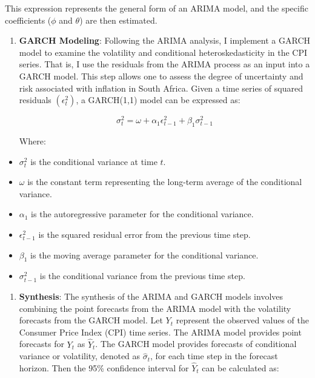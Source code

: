 \documentclass[11pt,preprint, authoryear]{elsarticle}
\numberwithin{equation}{section}
\numberwithin{figure}{section}
\numberwithin{table}{section}
\def\tightlist{} %
\begin{document}
This expression represents the general form of an ARIMA model, and the
specific coefficients (\(\phi\) and \(\theta\)) are then estimated.

\begin{enumerate}
\def\labelenumi{\arabic{enumi}.}
\setcounter{enumi}{1}
\item
  \textbf{GARCH Modeling}: Following the ARIMA analysis, I implement a
  GARCH model to examine the volatility and conditional
  heteroskedasticity in the CPI series. That is, I use the residuals
  from the ARIMA process as an input into a GARCH model. This step
  allows one to assess the degree of uncertainty and risk associated
  with inflation in South Africa. Given a time series of squared
  residuals \((\epsilon_t^2)\), a GARCH(1,1) model can be expressed as:

  \[
  \sigma_t^2 = \omega + \alpha_1 \epsilon_{t-1}^2 + \beta_1 \sigma_{t-1}^2
  \]

  Where:
\end{enumerate}

\begin{itemize}
\tightlist
\item
  \(\sigma_t^2\) is the conditional variance at time \(t\).
\item
  \(\omega\) is the constant term representing the long-term average of
  the conditional variance.
\item
  \(\alpha_1\) is the autoregressive parameter for the conditional
  variance.
\item
  \(\epsilon_{t-1}^2\) is the squared residual error from the previous
  time step.
\item
  \(\beta_1\) is the moving average parameter for the conditional
  variance.
\item
  \(\sigma_{t-1}^2\) is the conditional variance from the previous time
  step.
\end{itemize}

\hfill

\begin{enumerate}
\def\labelenumi{\arabic{enumi}.}
\setcounter{enumi}{2}
\tightlist
\item
  \textbf{Synthesis}: The synthesis of the ARIMA and GARCH models
  involves combining the point forecasts from the ARIMA model with the
  volatility forecasts from the GARCH model. Let \(Y_t\) represent the
  observed values of the Consumer Price Index (CPI) time series. The
  ARIMA model provides point forecasts for \(Y_t\) as \(\hat{Y}_t\). The
  GARCH model provides forecasts of conditional variance or volatility,
  denoted as \(\hat{\sigma}_t\), for each time step in the forecast
  horizon. Then the 95\% confidence interval for \(\hat{Y}_t\) can be
  calculated as:
\end{enumerate}
\end{document}

